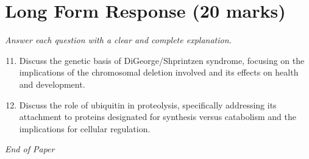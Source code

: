 \documentclass[12pt]{article}
\begin{document}
\section*{Long Form Response (20 marks)}
\textit{Answer each question with a clear and complete explanation.}
\begin{enumerate}[label=\arabic*.]
\setcounter{enumi}{10}
\item Discuss the genetic basis of DiGeorge/Shprintzen syndrome, focusing on the implications of the chromosomal deletion involved and its effects on health and development.
\item Discuss the role of ubiquitin in proteolysis, specifically addressing its attachment to proteins designated for synthesis versus catabolism and the implications for cellular regulation.
\end{enumerate}

\vfill
\noindent\textit{End of Paper}
\end{document}
